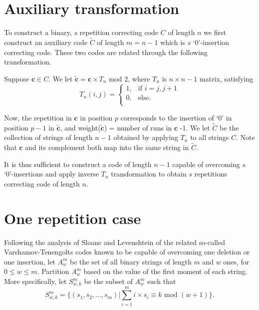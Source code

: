 \documentclass[10pt,conference]{IEEEtran}
\begin{document}
\vspace{0in}
\section{Auxiliary transformation}\label{aux}


To construct a binary, $s$ repetition correcting code $C$ of length
$n$ we first construct an auxiliary code $\tilde{C}$ of length
$m=n-1$ which is $s$ `0'-insertion correcting code. These two codes
are related through the following transformation.


Suppose $\mathbf{c} \in C$. We let $\mathbf{\tilde{c}}= \mathbf{c}
\times T_n \text{ mod } 2$, where $T_n$ is $n \times n-1$ matrix,
satisfying\vspace{-0.0in}\begin{equation}\label{eq:t}T_{n}(i,j)=\left\{
\begin{array}{lll}
    1, & \text{if }i = j,j+1\\
    0, & \text{else.} \\
\end{array} \right. \end{equation}


Now, the repetition in $\mathbf{c}$ in position $p$ corresponds to
the insertion of `0' in position $p-1$ in $\mathbf{\tilde{c}}$,
and weight($\mathbf{\tilde{c}}$) = number of runs in $\mathbf{c}$
-1. We let $\tilde{C}$ be the collection of strings of length
$n-1$ obtained by applying $T_n$ to all strings $C$. Note that
$\mathbf{c}$ and its complement both map into the same string in
$\tilde{C}$.

It is thus sufficient to construct a code of length $n-1$ capable of
overcoming $s$ `0'-insertions and apply inverse $T_n$ transformation
to obtain $s$ repetitions correcting code of length $n$.
\section{One repetition case}\label{one}
Following the analysis of Sloane \cite{sloane:00} and Levenshtein
\cite{lev:66} of the related so-called Varshamov-Tenengolts codes
\cite{vt:65} known to be capable of overcoming one deletion or one
insertion, let $A_w^m$ be the set of all binary strings of length
$m$ and $w$ ones, for $0 \leq w \leq m$. Partition $A_w^m$ based on
the value of the first moment of each string. More specifically, let
$S_{w,k}^m$ be the subset of $A_w^m$ such that
\begin{equation}S_{w,k}^m=\{(s_1,s_2,...,s_m)| \sum_{i=1}^m
i \times s_i \equiv
k \text{ mod } (w+1)\}.\end{equation}
\end{document}

